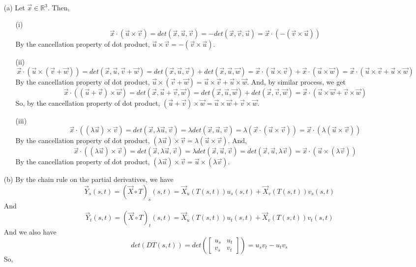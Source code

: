 \documentclass[11pt,letterpaper,cm]{nupset}
\newcommand{\bmat}[1]{\begin{bmatrix} #1 \end{bmatrix}}
\begin{document}
\begin{solution}
	\begin{itemize}
		\item[(a)]Let $\vec{x}\in\mathbb{R}^3$. Then,
		\begin{itemize}
			\item[(i)] $$\vec{x}\cdot(\vec{u}\times\vec{v})=det(\vec{x},\vec{u},\vec{v})=-det(\vec{x},\vec{v},\vec{u})=\vec{x}\cdot(-(\vec{v}\times\vec{u}))$$
			By the cancellation property of dot product, $\vec{u}\times\vec{v}=-(\vec{v}\times\vec{u})$.
			\item[(ii)] $$\vec{x}\cdot(\vec{u}\times(\vec{v}+\vec{w}))=det(\vec{x},\vec{u},\vec{v}+\vec{w})=det(\vec{x},\vec{u},\vec{v})+det(\vec{x},\vec{u},\vec{w})=\vec{x}\cdot(\vec{u}\times\vec{v})+\vec{x}\cdot(\vec{u}\times\vec{w})=\vec{x}\cdot(\vec{u}\times\vec{v}+\vec{u}\times\vec{w})$$ 
			By the cancellation property of dot product, $\vec{u}\times(\vec{v}+\vec{w})=\vec{u}\times\vec{v}+\vec{u}\times\vec{w}$. And, by similar process, we get
			$$\vec{x}\cdot((\vec{u}+\vec{v})\times\vec{w})=det(\vec{x},\vec{u}+\vec{v},\vec{w})=det(\vec{x},\vec{u},\vec{w})+det(\vec{x},\vec{v},\vec{w})=\vec{x}\cdot(\vec{u}\times\vec{w}+\vec{v}\times\vec{w})$$
			So, by the cancellation property of dot product, $(\vec{u}+\vec{v})\times\vec{w}=\vec{u}\times\vec{w}+\vec{v}\times\vec{w}$.
			\item[(iii)] $$\vec{x}\cdot((\lambda \vec{u})\times \vec{v})=det(\vec{x},\lambda\vec{u},\vec{v})=\lambda det(\vec{x},\vec{u},\vec{v})=\lambda(\vec{x}\cdot(\vec{u}\times\vec{v}))=\vec{x}\cdot(\lambda(\vec{u}\times\vec{v}))$$
			By the cancellation property of dot product, $(\lambda \vec{u})\times \vec{v}=\lambda(\vec{u}\times\vec{v})$. And,
			$$\vec{x}\cdot((\lambda \vec{u})\times \vec{v})=det(\vec{x},\lambda\vec{u},\vec{v})=\lambda det(\vec{x},\vec{u},\vec{v})=det(\vec{x},\vec{u},\lambda\vec{v})=\vec{x}\cdot(\vec{u}\times(\lambda\vec{v}))$$
			By the cancellation property of dot product, $(\lambda \vec{u})\times \vec{v}=\vec{u}\times(\lambda\vec{v})$.
		\end{itemize}
		\item[(b)] By the chain rule on the partial derivatives, we have
		$$\vec{Y}_s(s,t)=(\vec{X}\circ T)_s(s,t)=\vec{X}_u(T(s,t))u_s(s,t)+\vec{X}_v(T(s,t))v_s(s,t)$$
		And
		$$\vec{Y}_t(s,t)=(\vec{X}\circ T)_t(s,t)=\vec{X}_u(T(s,t))u_t(s,t)+\vec{X}_v(T(s,t))v_t(s,t)$$
		And we also have
		$$det(DT(s,t))=det(\bmat{u_s & u_t\\v_s & v_t})=u_sv_t-u_tv_s$$
		So,
		\begin{align*}

\end{align*}
\end{itemize}
\end{solution}
\end{document}
